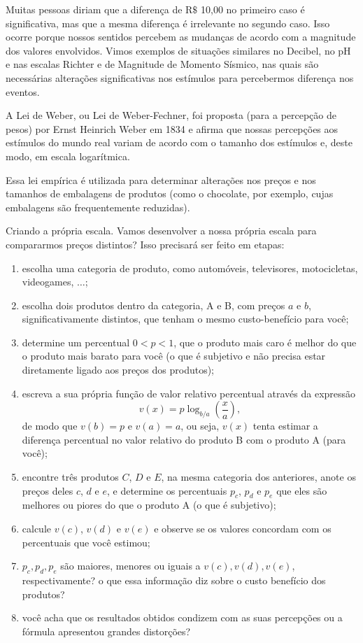 Muitas pessoas diriam que a diferença de R$\$$ 10,00 no primeiro caso é significativa, mas que a mesma diferença é irrelevante no segundo caso. Isso ocorre porque nossos sentidos percebem as mudanças de acordo com a magnitude dos valores envolvidos. Vimos exemplos de situações similares no Decibel, no pH e nas escalas Richter e de Magnitude de Momento Sísmico, nas quais são necessárias alterações significativas nos estímulos para percebermos diferença nos eventos.

A Lei de Weber, ou Lei de Weber-Fechner, foi proposta (para a percepção de pesos) por Ernst Heinrich Weber em 1834 e afirma que nossas percepções aos estímulos do mundo real variam de acordo com o tamanho dos estímulos e, deste modo, em escala logarítmica.

Essa lei empírica é utilizada para determinar alterações nos preços e nos tamanhos de embalagens de produtos (como o chocolate, por exemplo, cujas embalagens são frequentemente reduzidas).


\begin{task}{Criando a própria escala.}
Vamos desenvolver a nossa própria escala para compararmos preços distintos? Isso precisará ser feito em etapas:
\begin{enumerate}
\item escolha uma categoria de produto, como automóveis, televisores, motocicletas, videogames, $\ldots$;
\item escolha dois produtos dentro da categoria, A e B, com preços $a$ e $b$, significativamente distintos, que tenham o mesmo custo-benefício para você;
\item determine um percentual $0 < p <1$, que o produto mais caro é melhor do que o produto mais barato para você (o que é subjetivo e não precisa estar diretamente ligado aos preços dos produtos);
\item escreva a sua própria função de valor relativo percentual através da expressão
$$
v(x)=p\log_{b/a} \left( \frac{x}{a} \right),
$$
de modo que $v(b) = p$ e $v(a)=a$, ou seja, $v(x)$ tenta estimar a diferença percentual no valor relativo do produto B com o produto A (para você);
\item encontre três produtos $C$, $D$ e $E$, na mesma categoria dos anteriores, anote os preços deles $c$, $d$ e $e$, e determine os percentuais $p_c$, $p_d$ e $p_e$ que eles são melhores ou piores do que o produto A (o que é subjetivo);
\item calcule $v(c)$, $v(d)$ e $v(e)$ e observe se os valores concordam com os percentuais que você estimou;
\item  $p_c, p_d, p_e$ são maiores, menores ou iguais a $v(c), v(d), v(e)$, respectivamente? o que essa informação diz sobre o custo benefício dos produtos?  
\item você acha que os resultados obtidos condizem com as suas percepções ou a fórmula apresentou grandes distorções?
\end{enumerate}
\end{task}

